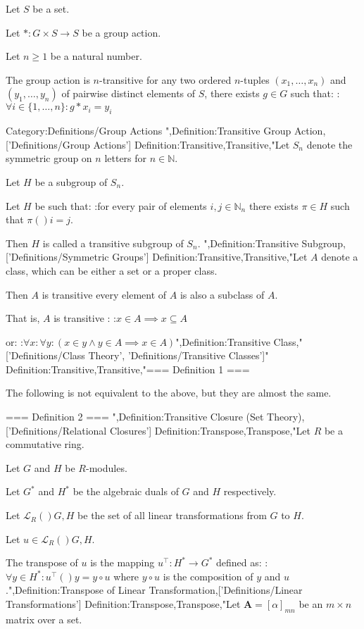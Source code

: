 Let $S$ be a set.

Let $*: G \times S \to S$ be a group action.

Let $n\geq1$ be a natural number.


The group action is $n$-transitive  for any two ordered $n$-tuples $(x_1, \ldots, x_n)$ and $(y_1, \ldots, y_n)$ of pairwise distinct elements of $S$, there exists $g\in G$ such that:
:$\forall i\in \{1, \ldots, n\} : g * x_i = y_i$


Category:Definitions/Group Actions
",Definition:Transitive Group Action,['Definitions/Group Actions']
Definition:Transitive,Transitive,"Let $S_n$ denote the symmetric group on $n$ letters for $n \in \mathbb N$.

Let $H$ be a subgroup of $S_n$.

Let $H$ be such that:
:for every pair of elements $i, j \in \mathbb N_n$ there exists $\pi \in H$ such that $\pi \left(   \right)i = j$.


Then $H$ is called a transitive subgroup of $S_n$.
",Definition:Transitive Subgroup,['Definitions/Symmetric Groups']
Definition:Transitive,Transitive,"Let $A$ denote a class, which can be either a set or a proper class.

Then $A$ is transitive  every element of $A$ is also a subclass of $A$.


That is, $A$ is transitive :
:$x \in A \implies x \subseteq A$

or:
:$\forall x: \forall y: \left( x \in y \land y \in A \implies x \in A \right)$",Definition:Transitive Class,"['Definitions/Class Theory', 'Definitions/Transitive Classes']"
Definition:Transitive,Transitive,"=== Definition 1 ===


The following is not equivalent to the above, but they are almost the same.

=== Definition 2 ===
",Definition:Transitive Closure (Set Theory),['Definitions/Relational Closures']
Definition:Transpose,Transpose,"Let $R$ be a commutative ring.

Let $G$ and $H$ be $R$-modules.

Let $G^*$ and $H^*$ be the algebraic duals of $G$ and $H$ respectively.


Let $\mathcal L_R \left(   \right){G, H}$ be the set of all linear transformations from $G$ to $H$.

Let $u \in \mathcal L_R \left(   \right){G, H}$.


The transpose of $u$ is the mapping $u^\intercal: H^* \to G^*$ defined as:
:$\forall y \in H^*: u^\intercal \left(   \right)y = y \circ u$
where $y \circ u$ is the composition of $y$ and $u$.",Definition:Transpose of Linear Transformation,['Definitions/Linear Transformations']
Definition:Transpose,Transpose,"Let $\mathbf A = \left[ \alpha \right]_{m n}$ be an $m \times n$ matrix over a set.


